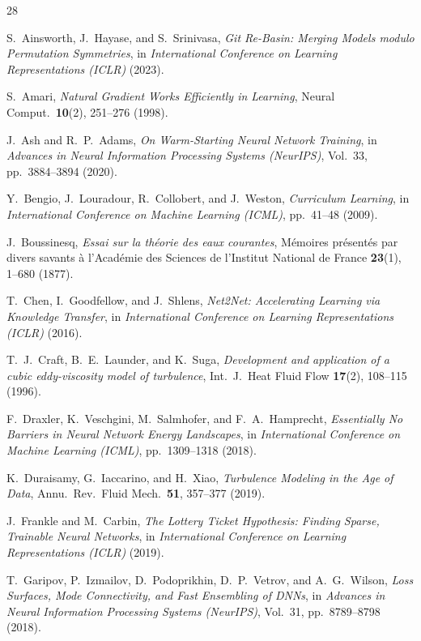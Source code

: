 \documentclass[preprint,aps,prb,longbibliography,superscriptaddress]{revtex4-2}
\begin{document}
\begin{thebibliography}{28}

  S.~Ainsworth, J.~Hayase, and S.~Srinivasa,
  \emph{Git Re-Basin: Merging Models modulo Permutation Symmetries},
  in \emph{International Conference on Learning Representations (ICLR)} (2023).

  S.~Amari,
  \emph{Natural Gradient Works Efficiently in Learning},
  Neural Comput.\ \textbf{10}(2), 251--276 (1998).

  J.~Ash and R.~P.~Adams,
  \emph{On Warm-Starting Neural Network Training},
  in \emph{Advances in Neural Information Processing Systems (NeurIPS)},
  Vol.~33, pp.~3884--3894 (2020).

  Y.~Bengio, J.~Louradour, R.~Collobert, and J.~Weston,
  \emph{Curriculum Learning},
  in \emph{International Conference on Machine Learning (ICML)},
  pp.~41--48 (2009).

  J.~Boussinesq,
  \emph{Essai sur la th\'eorie des eaux courantes},
  M\'emoires pr\'esent\'es par divers savants \`a l'Acad\'emie des Sciences
  de l'Institut National de France \textbf{23}(1), 1--680 (1877).

  T.~Chen, I.~Goodfellow, and J.~Shlens,
  \emph{Net2Net: Accelerating Learning via Knowledge Transfer},
  in \emph{International Conference on Learning Representations (ICLR)} (2016).

  T.~J.~Craft, B.~E.~Launder, and K.~Suga,
  \emph{Development and application of a cubic eddy-viscosity model of turbulence},
  Int.\ J.\ Heat Fluid Flow \textbf{17}(2), 108--115 (1996).

  F.~Draxler, K.~Veschgini, M.~Salmhofer, and F.~A.~Hamprecht,
  \emph{Essentially No Barriers in Neural Network Energy Landscapes},
  in \emph{International Conference on Machine Learning (ICML)},
  pp.~1309--1318 (2018).

  K.~Duraisamy, G.~Iaccarino, and H.~Xiao,
  \emph{Turbulence Modeling in the Age of Data},
  Annu.\ Rev.\ Fluid Mech.\ \textbf{51}, 357--377 (2019).

  J.~Frankle and M.~Carbin,
  \emph{The Lottery Ticket Hypothesis: Finding Sparse, Trainable Neural Networks},
  in \emph{International Conference on Learning Representations (ICLR)} (2019).

  T.~Garipov, P.~Izmailov, D.~Podoprikhin, D.~P.~Vetrov, and A.~G.~Wilson,
  \emph{Loss Surfaces, Mode Connectivity, and Fast Ensembling of DNNs},
  in \emph{Advances in Neural Information Processing Systems (NeurIPS)},
  Vol.~31, pp.~8789--8798 (2018).


\end{thebibliography}
\end{document}

